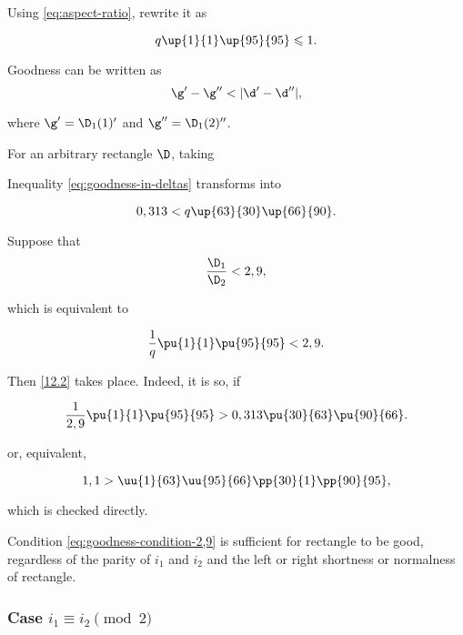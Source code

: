 Using \ref{eq:aspect-ratio}, rewrite it as

\begin{equation}\label{horizontality}
	q \up{1}{1} \up{95}{95} \leqslant 1.
\end{equation}

Goodness can be written as
\begin{equation}\label{eq:goodness-in-deltas}
	\g' - \g'' < |\d' - \d''|,
\end{equation}

where $\g' = \D_1(1)'$ and $\g'' = \D_1(2)''$.

For an arbitrary rectangle $\D$, taking

Inequality \ref{eq:goodness-in-deltas} transforms into

\begin{equation}\label{12.2}
	0,313 < q \up{63}{30} \up{66}{90}.
\end{equation}

Suppose that
%
\begin{equation}\label{eq:goodness-condition-2,9}
	\dfrac{\D_1}{\D_2} < 2,9,
\end{equation}

which is equivalent to

\begin{equation}
	\dfrac{1}{q} \pu{1}{1} \pu{95}{95} < 2,9.
\end{equation}

Then \ref{12.2} takes place. Indeed, it is so, if

\begin{equation*}
	\dfrac{1}{2,9} \pu{1}{1} \pu{95}{95} > 0,313 \pu{30}{63} \pu{90}{66}.
\end{equation*}

or, equivalent,

\begin{equation*}
	1,1 > \uu{1}{63} \uu{95}{66} \pp{30}{1} \pp{90}{95},
\end{equation*}

which is checked directly.

Condition \ref{eq:goodness-condition-2,9} is sufficient for rectangle to be good,
regardless of the parity of $i_1$ and $i_2$ and the left or right shortness or normalness of rectangle.

\subsubsection{Case $i_1 \equiv i_2 \pmod 2$}

